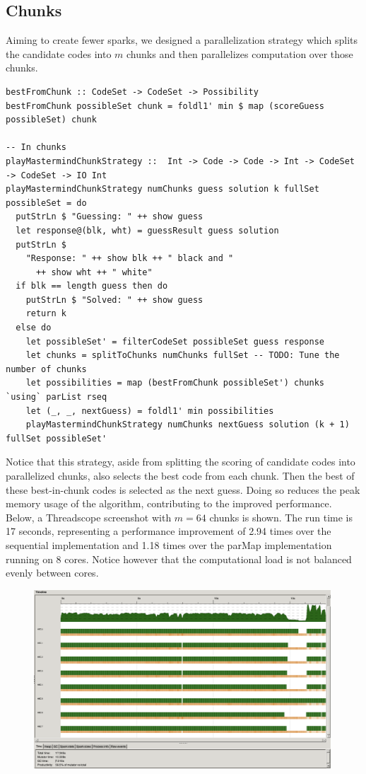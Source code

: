 \documentclass{article}
\begin{document}
\subsection{Chunks}
Aiming to create fewer sparks, we designed a parallelization strategy which splits the candidate codes into $m$ chunks and then parallelizes computation over those chunks.
\begin{verbatim}
bestFromChunk :: CodeSet -> CodeSet -> Possibility
bestFromChunk possibleSet chunk = foldl1' min $ map (scoreGuess possibleSet) chunk

-- In chunks
playMastermindChunkStrategy ::  Int -> Code -> Code -> Int -> CodeSet -> CodeSet -> IO Int
playMastermindChunkStrategy numChunks guess solution k fullSet possibleSet = do
  putStrLn $ "Guessing: " ++ show guess
  let response@(blk, wht) = guessResult guess solution
  putStrLn $
    "Response: " ++ show blk ++ " black and "
      ++ show wht ++ " white"
  if blk == length guess then do
    putStrLn $ "Solved: " ++ show guess
    return k
  else do
    let possibleSet' = filterCodeSet possibleSet guess response
    let chunks = splitToChunks numChunks fullSet -- TODO: Tune the number of chunks
    let possibilities = map (bestFromChunk possibleSet') chunks `using` parList rseq
    let (_, _, nextGuess) = foldl1' min possibilities
    playMastermindChunkStrategy numChunks nextGuess solution (k + 1) fullSet possibleSet'
\end{verbatim}

Notice that this strategy, aside from splitting the scoring of candidate codes into parallelized chunks, also selects the best code from each chunk. Then the best of these best-in-chunk codes is selected as the next guess. Doing so reduces the peak memory usage of the algorithm, contributing to the improved performance. Below, a Threadscope screenshot with $m=64$ chunks is shown. The run time is 17 seconds, representing a performance improvement of 2.94 times over the sequential implementation and 1.18 times over the parMap implementation running on 8 cores. Notice however that the computational load is not balanced evenly between cores.

\begin{figure}[H]
	\centering
	\includegraphics[width=30em]{../images/64_sc.png}
\end{figure}
\end{document}
